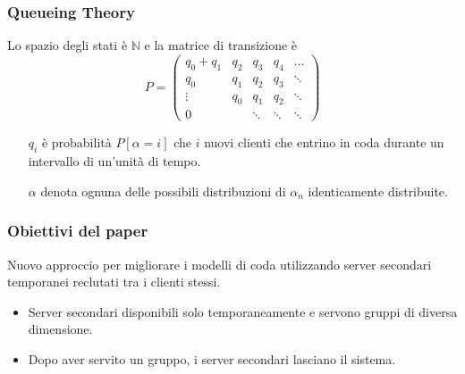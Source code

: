 \documentclass{beamer}
\newcommand{\N}{\mathbb{N}}
\begin{document}
\begin{frame}
    \frametitle{Queueing Theory}
    Lo spazio degli stati è $\N$ e la matrice di transizione è
    \begin{equation*}
        P = \begin{pmatrix}
            q_0 + q_1 & q_2 & q_3 & q_4 & \ldots \\
            q_0 & q_1 & q_2 & q_3 & \ddots \\
            \vdots & q_0 & q_1 & q_2 & \ddots \\
            0 &  & \ddots & \ddots & \ddots
        \end{pmatrix}
    \end{equation*}
    \begin{block}{}
        \begin{itemize}
            \item [$q_i$] è probabilità $P[\alpha=i]$ che $i$ nuovi clienti che entrino in coda durante un intervallo di un'unità di tempo.
            \item [$\alpha$] denota ognuna delle possibili distribuzioni di $\alpha_n$ identicamente distribuite.
        \end{itemize}
    \end{block}
\end{frame}



\begin{frame}
    \frametitle{Obiettivi del paper}
    Nuovo approccio per migliorare i modelli di coda utilizzando server secondari temporanei reclutati tra i clienti stessi.
    \begin{block}{}
            \begin{itemize}
                \item Server secondari disponibili solo temporaneamente e servono gruppi di diversa dimensione.
                \item Dopo aver servito un gruppo, i server secondari lasciano il sistema.
            \end{itemize}
    \end{block}
\end{frame}
\end{document}
